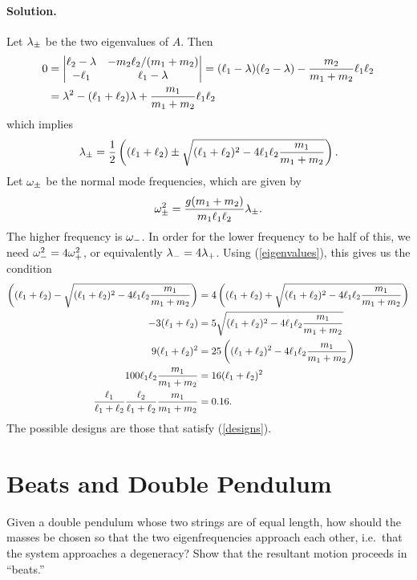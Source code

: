 \documentclass[11pt]{article}
\newcommand{\refeq}[1]{(\ref{#1})}
\newenvironment{statement}
{
    \color{darkgray}
    \ignorespaces
}
{
}
\newenvironment{solution}
{
    \paragraph{Solution.}
    \ignorespaces
}
{
    \bigskip
}
\renewcommand{\vec}[1]{\mathbf{#1}}
\begin{document}
\begin{solution}
	Let $\lambda_\pm$ be the two eigenvalues of $A$.  Then
	\begin{align}
		0 &= \mdet{\elw - \lambda & -\mw \elw / (\mq + \mw) \\ -\elq & \elq - \lambda} = (\elq - \lambda) (\elw - \lambda) - \frac{\mw}{\mq + \mw} \elq \elw \\
		&= \lambda^2 - (\elq + \elw) \lambda + \frac{\mq}{\mq + \mw} \elq \elw
	\end{align}
	which implies
	\begin{equation} \label{eigenvalues}
		\lambda_\pm = \frac{1}{2} \left( (\ell_1 + \ell_2) \pm \sqrt{(\ell_1 + \ell_2)^2 - 4 \ell_1 \ell_2 \frac{m_1}{m_1 + m_2}} \right).
	\end{equation}
	Let $\omega_\pm$ be the normal mode frequencies, which are given by
	\begin{equation} \label{frequencies}
		\omega_\pm^2 = \frac{g (m_1 + m_2)}{m_1 \ell_1 \ell_2} \lambda_\pm.
	\end{equation}
	The higher frequency is $\omega_-$.  In order for the lower frequency to be half of this, we need $\omega_-^2 = 4 \omega_+^2$, or equivalently $\lambda_- = 4 \lambda_+$.  Using \refeq{eigenvalues}, this gives us the condition
	\begin{align}
		\left( (\ell_1 + \ell_2) - \sqrt{(\ell_1 + \ell_2)^2 - 4 \ell_1 \ell_2 \frac{m_1}{m_1 + m_2}} \right) &= 4 \left( (\ell_1 + \ell_2) + \sqrt{(\ell_1 + \ell_2)^2 - 4 \ell_1 \ell_2 \frac{m_1}{m_1 + m_2}} \right) \\
		-3 (\ell_1 + \ell_2) &= 5 \sqrt{(\ell_1 + \ell_2)^2 - 4 \ell_1 \ell_2 \frac{m_1}{m_1 + m_2}} \\
		9 (\ell_1 + \ell_2)^2 &= 25 \left( (\ell_1 + \ell_2)^2 - 4 \ell_1 \ell_2 \frac{m_1}{m_1 + m_2} \right) \\
		100 \ell_1 \ell_2 \frac{m_1}{m_1 + m_2} &= 16 (\ell_1 + \ell_2)^2 \\
		\frac{\ell_1}{\ell_1 + \ell_2} \frac{\ell_2}{\ell_1 + \ell_2} \frac{m_1}{m_1 + m_2} &= 0.16. \label{designs}
	\end{align}
	The possible designs are those that satisfy \refeq{designs}.
\end{solution}

\newcommand{\vv}{\vec{v}}
\newcommand{\vvpm}{\vec{v}_\pm}
\newcommand{\vq}{v_1}
\newcommand{\vw}{v_2}

\newcommand{\Cp}{C_+}
\newcommand{\Cm}{C_-}
\newcommand{\Cpm}{C_\pm}
\newcommand{\php}{\phi_+}
\newcommand{\phm}{\phi_-}
\newcommand{\phpm}{\phi_\pm}

\section{Beats and Double Pendulum} \label{prob3}
\begin{statement}
	Given a double pendulum whose two strings are of equal length, how should the masses be chosen so that the two eigenfrequencies approach each other, i.e.~that the system approaches a degeneracy?  Show that the resultant motion proceeds in ``beats.''
\end{statement}
\end{document}

